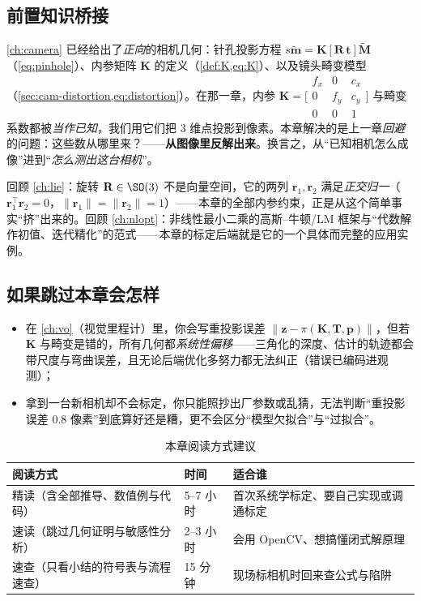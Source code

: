 \subsection*{前置知识桥接}
\cref{ch:camera} 已经给出了\emph{正向}的相机几何：针孔投影方程 $s\tilde{\mathbf{m}}=\mathbf{K}[\mathbf{R}\,\mathbf{t}]\tilde{\mathbf{M}}$（\cref{eq:pinhole}）、内参矩阵 $\mathbf{K}$ 的定义（\cref{def:K,eq:K}）、以及镜头畸变模型（\cref{sec:cam-distortion,eq:distortion}）。在那一章，内参 $\mathbf{K}=\big[\begin{smallmatrix}f_x&0&c_x\\0&f_y&c_y\\0&0&1\end{smallmatrix}\big]$ 与畸变系数都被\emph{当作已知}，我们用它们把 $3$ 维点投影到像素。本章解决的是上一章\emph{回避}的问题：这些数从哪里来？——\textbf{从图像里反解出来}。换言之，从“已知相机怎么成像”进到“\emph{怎么测出这台相机}”。

回顾 \cref{ch:lie}：旋转 $\mathbf{R}\in\SO(3)$ 不是向量空间，它的两列 $\mathbf{r}_1,\mathbf{r}_2$ 满足\emph{正交归一}（$\mathbf{r}_1^\top\mathbf{r}_2=0$，$\|\mathbf{r}_1\|=\|\mathbf{r}_2\|=1$）——本章的全部内参约束，正是从这个简单事实“挤”出来的。回顾 \cref{ch:nlopt}：非线性最小二乘的高斯--牛顿/LM 框架与“代数解作初值、迭代精化”的范式——本章的标定后端就是它的一个具体而完整的应用实例。

\subsection*{如果跳过本章会怎样}
\begin{itemize}
  \item 在 \cref{ch:vo}（视觉里程计）里，你会写重投影误差 $\|\mathbf{z}-\pi(\mathbf{K},\mathbf{T},\mathbf{p})\|$，但若 $\mathbf{K}$ 与畸变是错的，所有几何都\emph{系统性偏移}——三角化的深度、估计的轨迹都会带尺度与弯曲误差，且无论后端优化多努力都无法纠正（错误已编码进观测）；
  \item 拿到一台新相机却不会标定，你只能照抄出厂参数或乱猜，无法判断“重投影误差 $0.8$ 像素”到底算好还是糟，更不会区分“模型欠拟合”与“过拟合”。
\end{itemize}

\begin{table}[ht]\centering\small
\caption{本章阅读方式建议}
\begin{tabular}{lll}
\toprule
阅读方式 & 时间 & 适合谁 \\
\midrule
精读（含全部推导、数值例与代码） & 5--7 小时 & 首次系统学标定、要自己实现或调通标定 \\
速读（跳过几何证明与敏感性分析） & 2--3 小时 & 会用 OpenCV、想搞懂闭式解原理 \\
速查（只看小结的符号表与流程速查） & 15 分钟 & 现场标相机时回来查公式与陷阱 \\
\bottomrule
\end{tabular}
\end{table}

